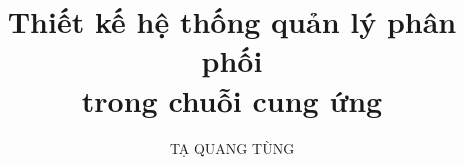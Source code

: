 \documentclass[a4paper,12pt,3p]{report}
\begin{document}
\title{\LARGE {\bf Thiết kế hệ thống quản lý phân phối \\ trong chuỗi cung ứng}\\
 \vspace*{7mm}
}

\author{TẠ QUANG TÙNG}

\normallinespacing
\maketitle

\preface



\body








\appendix

\label{sect:bib}


%
%
\end{document}
